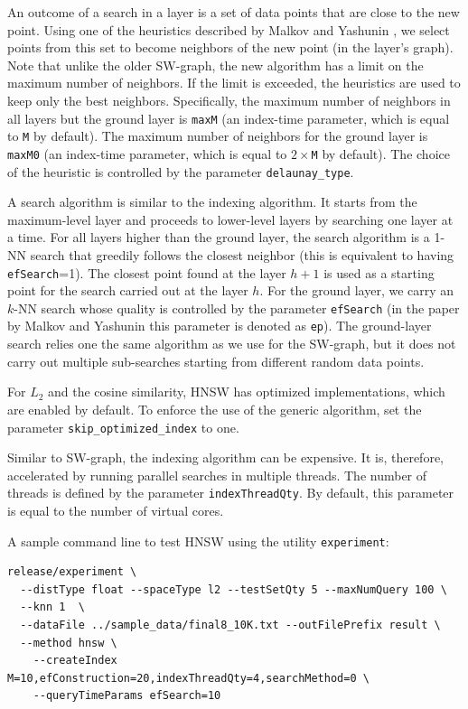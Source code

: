 \documentclass[runningheads,a4paper]{llncs}
\newcommand{\ttt}[1]{\texttt{#1}}
\newcommand{\knn}{$k$-NN }
\begin{document}
An outcome of a search in a layer is a set of data points that are close to the new point.
Using one of the heuristics described by Malkov and Yashunin \cite{Malkov2016},
we select points from this set to become neighbors of the new point (in the layer's graph).
Note that unlike the older SW-graph, the new algorithm has a limit on the maximum number of neighbors.
If the limit is exceeded, the heuristics are used to keep only the best neighbors.
Specifically, the maximum number of neighbors in all layers but the ground layer is \ttt{maxM} (an index-time parameter,
which is equal to \ttt{M} by default).
The maximum number of neighbors for the ground layer is \ttt{maxM0} (an index-time parameter,
which is equal to $2\times$\ttt{M} by default). 
The choice of the heuristic is controlled by the parameter \ttt{delaunay\_type}.

A search algorithm is similar to the indexing algorithm. 
It starts from the maximum-level layer and proceeds to lower-level layers by searching one layer at a time.
For all layers higher than the ground layer, the search algorithm is a 1-NN search 
that greedily follows the closest neighbor (this is equivalent to having \ttt{efSearch}=1).
The closest point found at the layer $h+1$ is used as a starting point for the search carried out at the layer $h$. 
For the ground layer, we carry an \knn search whose quality is controlled by the parameter \ttt{efSearch} (in the 
paper by Malkov and Yashunin \cite{Malkov2016} this parameter is denoted as \ttt{ep}).
The ground-layer search relies one the same algorithm as we use for the SW-graph,
but it does not carry out multiple sub-searches starting from different random data points.

For $L_2$ and the cosine similarity, HNSW has optimized implementations, which are enabled by default.
To enforce the use of the generic algorithm, set the parameter \ttt{skip\_optimized\_index} to one.

Similar to SW-graph, the indexing algorithm can be expensive. 
It is, therefore, accelerated by running parallel searches in multiple threads. 
The number of threads is defined by the
parameter \ttt{indexThreadQty}. By default, this parameter is equal to the number
of virtual cores.

A sample command line to test HNSW using the utility \texttt{experiment}:
{
\footnotesize
\begin{verbatim}
release/experiment \
  --distType float --spaceType l2 --testSetQty 5 --maxNumQuery 100 \
  --knn 1  \
  --dataFile ../sample_data/final8_10K.txt --outFilePrefix result \
  --method hnsw \
    --createIndex M=10,efConstruction=20,indexThreadQty=4,searchMethod=0 \
    --queryTimeParams efSearch=10 
\end{verbatim}
}
\end{document}
